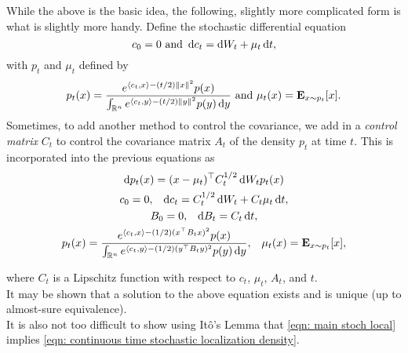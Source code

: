 		While the above is the basic idea, the following, slightly more complicated form is what is slightly more handy. Define the stochastic differential equation
		\begin{equation}
			\label{eqn: stochastic localization identity control}
			c_0 = 0 \text{ and } \operatorname{d}\!{c}_t = \operatorname{d}\!{W}_t + \mu_t\operatorname{d}\!{t},
		\end{equation}
		with $p_t$ and $\mu_t$ defined by
		\[ p_t(x) = \frac{e^{\langle c_t,x\rangle - (t/2)\left\lVert x\right\rVert^2}p(x)}{\int_{\mathbb{R}^n}e^{\langle c_t,y\rangle - (t/2)\left\lVert y\right\rVert^2}p(y)\operatorname{d}\!{y}}\text{ and } \mu_t(x) = \textbf{E}_{x\sim p_t} [x]. \]
		Sometimes, to add another method to control the covariance, we add in a \textit{control matrix} $C_t$ to control the covariance matrix $A_t$ of the density $p_t$ at time $t$. This is incorporated into the previous equations as
		\begin{equation}
			\label{eqn: main stoch local}
			\begin{gathered}
				\d{p_t}(x) =  (x - \mu_t)^\top C_t^{1/2} \d{W}_t p_t(x) \\
				c_0 = 0, \;\;\; \d{c}_t = C_t^{1/2}\d{W}_t + C_t\mu_t\d{t}, \\
				B_0 = 0, \;\;\; \d{B}_t = C_t\d{t}, \\
				p_t(x) = \frac{e^{\langle c_t,x\rangle - (1/2)(x^\top B_t x)^2}p(x)}{\int_{\Rn}e^{\langle c_t,y\rangle - (1/2)(y^\top B_t y)^2}p(y)\d{y}}, \;\;\; \mu_t(x) = \expec_{x\sim p_t} [x], \\	
			\end{gathered}
		\end{equation}

		where $C_t$ is a Lipschitz function with respect to $c_t$, $\mu_t$, $A_t$, and $t$.\\
		It may be shown that a solution to the above equation exists and is unique (up to almost-sure equivalence).\\
		It is also not too difficult to show using It\^{o}'s Lemma that \eqref{eqn: main stoch local} implies \eqref{eqn: continuous time stochastic localization density}.\\


